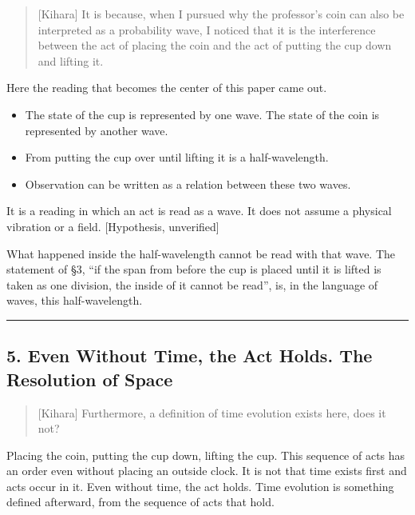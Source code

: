 \documentclass[
  a4paper,
]{article}
\providecommand{\tightlist}{%
  \setlength{\itemsep}{0pt}\setlength{\parskip}{0pt}}
\begin{document}
\begin{quote}
{[}Kihara{]} It is because, when I pursued why the professor's coin can
also be interpreted as a probability wave, I noticed that it is the
interference between the act of placing the coin and the act of putting
the cup down and lifting it.
\end{quote}

Here the reading that becomes the center of this paper came out.

\begin{itemize}
\tightlist
\item
  The state of the cup is represented by one wave. The state of the coin
  is represented by another wave.
\item
  From putting the cup over until lifting it is a half-wavelength.
\item
  Observation can be written as a relation between these two waves.
\end{itemize}

It is a reading in which an act is read as a wave. It does not assume a
physical vibration or a field. {[}Hypothesis, unverified{]}

What happened inside the half-wavelength cannot be read with that wave.
The statement of §3, ``if the span from before the cup is placed until
it is lifted is taken as one division, the inside of it cannot be
read'', is, in the language of waves, this half-wavelength.

\begin{center}\rule{0.5\linewidth}{0.5pt}\end{center}

\subsection{5. Even Without Time, the Act Holds. The Resolution of
Space}\label{even-without-time-the-act-holds.-the-resolution-of-space}

\begin{quote}
{[}Kihara{]} Furthermore, a definition of time evolution exists here,
does it not?
\end{quote}

Placing the coin, putting the cup down, lifting the cup. This sequence
of acts has an order even without placing an outside clock. It is not
that time exists first and acts occur in it. Even without time, the act
holds. Time evolution is something defined afterward, from the sequence
of acts that hold.
\end{document}

